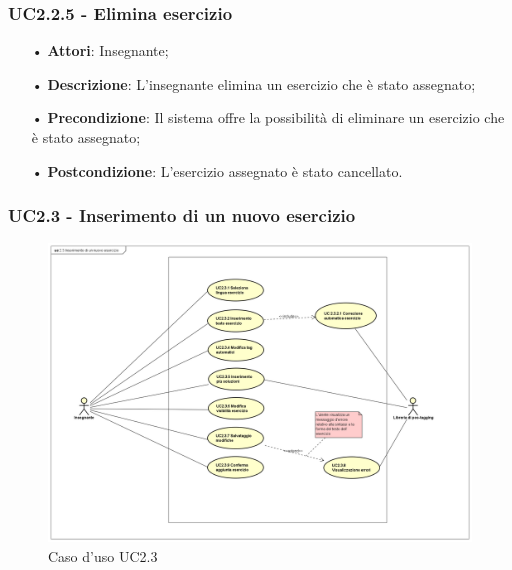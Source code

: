 \subsubsection{UC2.2.5 - Elimina esercizio}
\begin{itemize}
	\item[•] \textbf{Attori}: Insegnante;
	\item[•] \textbf{Descrizione}: L’insegnante elimina un esercizio che è stato assegnato;
	\item[•] \textbf{Precondizione}: Il sistema offre la possibilità di eliminare un esercizio che è stato assegnato;
	\item[•] \textbf{Postcondizione}: L’esercizio assegnato è stato cancellato.
\end{itemize}


\subsubsection{UC2.3 - Inserimento di un nuovo esercizio}

\begin{figure}[H]
	\centering
	\includegraphics[width=17cm]{img/UC23.png} 
	\caption{Caso d'uso UC2.3}
\end{figure}

